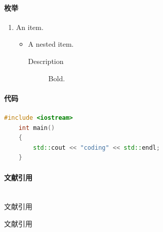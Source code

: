 \documentclass[UTF8, a4paper]{ctexart}
\begin{document}
\paragraph{枚举}
\begin{enumerate}[(1)]   %
    \setlength{\itemsep}{0pt}
    \item An item.
    \begin{itemize} %
        \item A nested item.
        \begin{description} %
            \item[Description] Bold. 
        \end{description}
    \end{itemize}
\end{enumerate}


\paragraph{代码}
\begin{lstlisting}[language=C++]
    #include <iostream>
    int main()
    {
        std::cout << "coding" << std::endl;
    }
\end{lstlisting}

\paragraph{文献引用}~{}\\
文献引用
\cite{引用}
\begin{thebibliography}{}
     文献引用
\end{thebibliography}

\end{document}

